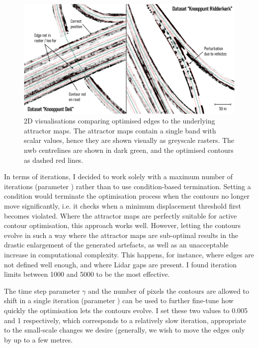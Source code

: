 \begin{figure}
    \centering
    \includegraphics[width=\linewidth]{final_report/figs/activecontouroptimisation1.png}
    \caption[Visualisations comparing optimised edges to attractor maps]{2D visualisations comparing optimised edges to the underlying attractor maps. The attractor maps contain a single band with scalar values, hence they are shown visually as greyscale rasters. The \ac{nwb} centrelines are shown in dark green, and the optimised contours as dashed red lines.}
    \label{fig:activecontouroptimisation1}
\end{figure}

In terms of iterations, I decided to work solely with a maximum number of iterations (parameter ) rather than to use condition-based termination. Setting a condition would terminate the optimisation process when the contours no longer move significantly, i.e. it checks when a minimum displacement threshold first becomes violated. Where the attractor maps are perfectly suitable for active contour optimisation, this approach works well. However, letting the contours evolve in such a way where the attractor maps are sub-optimal results in the drastic enlargement of the generated artefacts, as well as an unacceptable increase in computational complexity. This happens, for instance, where edges are not defined well enough, and where Lidar gaps are present. I found iteration limits between 1000 and 5000 to be the most effective.

The time step parameter $\gamma$ and the number of pixels the contours are allowed to shift in a single iteration (parameter ) can be used to further fine-tune how quickly the optimisation lets the contours evolve. I set these two values to 0.005 and 1 respectively, which corresponds to a relatively slow iteration, appropriate to the small-scale changes we desire (generally, we wish to move the edges only by up to a few metres.

